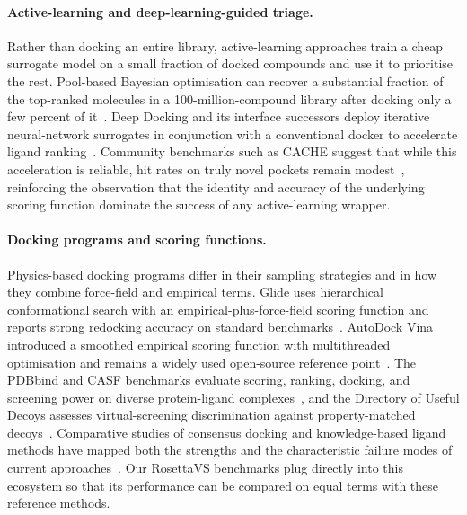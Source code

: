\documentclass[11pt]{article}
\begin{document}
\paragraph{Active-learning and deep-learning-guided triage.}
Rather than docking an entire library, active-learning approaches train a
cheap surrogate model on a small fraction of docked compounds and use it
to prioritise the rest. Pool-based Bayesian optimisation can recover a
substantial fraction of the top-ranked molecules in a 100-million-compound
library after docking only a few percent of
it~\citep{graff2021accelerating}. Deep Docking and its interface successors
deploy iterative neural-network surrogates in conjunction with a
conventional docker to accelerate ligand
ranking~\citep{gentile2022deepdocking,yaacoub2022ddgui}. Community
benchmarks such as CACHE suggest that while this acceleration is
reliable, hit rates on truly novel pockets remain
modest~\citep{li2024cache}, reinforcing the observation that the identity
and accuracy of the underlying scoring function dominate the success of
any active-learning wrapper.

\paragraph{Docking programs and scoring functions.}
Physics-based docking programs differ in their sampling strategies and in
how they combine force-field and empirical terms. Glide uses hierarchical
conformational search with an empirical-plus-force-field scoring function
and reports strong redocking accuracy on standard
benchmarks~\citep{friesner2004glide}. AutoDock Vina introduced a smoothed
empirical scoring function with multithreaded optimisation and remains a
widely used open-source reference point~\citep{trott2010vina}. The PDBbind
and CASF benchmarks evaluate scoring, ranking, docking, and screening
power on diverse protein-ligand
complexes~\citep{liu2017pdbbind,su2019casf2016}, and the Directory of
Useful Decoys assesses virtual-screening discrimination against
property-matched decoys~\citep{mysinger2012dude}. Comparative studies of
consensus docking and knowledge-based ligand methods have mapped both
the strengths and the characteristic failure modes of current
approaches~\citep{chaput2017usc,ebejer2019ligity}. Our RosettaVS
benchmarks plug directly into this ecosystem so that its performance can
be compared on equal terms with these reference methods.
\end{document}
